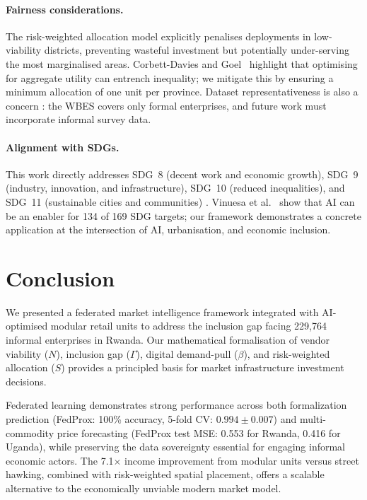 \documentclass{article}
\begin{document}
\paragraph{Fairness considerations.}
The risk-weighted allocation model explicitly penalises deployments in low-viability districts, preventing wasteful investment but potentially under-serving the most marginalised areas.
Corbett-Davies and Goel~ highlight that optimising for aggregate utility can entrench inequality; we mitigate this by ensuring a minimum allocation of one unit per province.
Dataset representativeness is also a concern \cite{scheuerman2021datasets}: the WBES covers only formal enterprises, and future work must incorporate informal survey data.

\paragraph{Alignment with SDGs.}
This work directly addresses SDG~8 (decent work and economic growth), SDG~9 (industry, innovation, and infrastructure), SDG~10 (reduced inequalities), and SDG~11 (sustainable cities and communities) \cite{un2015sdg}.
Vinuesa et al.~ show that AI can be an enabler for 134 of 169 SDG targets; our framework demonstrates a concrete application at the intersection of AI, urbanisation, and economic inclusion.

\section{Conclusion}
\label{sec:conclusion}

We presented a federated market intelligence framework integrated with AI-optimised modular retail units to address the inclusion gap facing 229,764 informal enterprises in Rwanda.
Our mathematical formalisation of vendor viability ($N$), inclusion gap ($\Gamma$), digital demand-pull ($\beta$), and risk-weighted allocation ($S$) provides a principled basis for market infrastructure investment decisions.

Federated learning demonstrates strong performance across both formalization prediction (FedProx: 100\% accuracy, 5-fold CV: $0.994 \pm 0.007$) and multi-commodity price forecasting (FedProx test MSE: 0.553 for Rwanda, 0.416 for Uganda), while preserving the data sovereignty essential for engaging informal economic actors.
The 7.1$\times$ income improvement from modular units versus street hawking, combined with risk-weighted spatial placement, offers a scalable alternative to the economically unviable modern market model.
\end{document}
